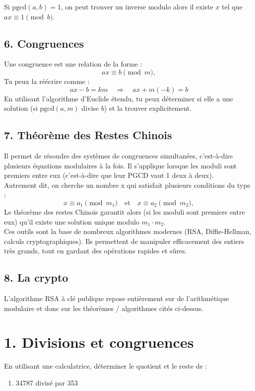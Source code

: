 Si $\text{pgcd}(a,b)=1$, on peut trouver un inverse modulo alors il existe $x$ tel que $ax \equiv 1 \pmod{b}$.

\subsection*{6. Congruences}
Une congruence est une relation de la forme :
\[
ax \equiv b \pmod{m},
\]
Tu peux la réécrire comme : 
\[
ax - b = km \quad \Rightarrow \quad ax + m(-k) = b
\]
En utilisant l’algorithme d’Euclide étendu, tu peux déterminer si elle a une solution (si $\text{pgcd}(a,m)$ divise $b$) et la trouver explicitement.\\

\subsection*{7. Théorème des Restes Chinois}
Il permet de résoudre des systèmes de congruences simultanées, c’est-à-dire plusieurs équations modulaires à la fois. Il s’applique lorsque les moduli sont premiers entre eux (c’est-à-dire que leur PGCD vaut 1 deux à deux). \\

Autrement dit, on cherche un nombre x qui satisfait plusieurs conditions du type :
\[
x \equiv a_1 \pmod{m_1} \quad \text{et} \quad x \equiv a_2 \pmod{m_2},
\]
Le théorème des restes Chinois garantit alors (si les moduli sont premiers entre eux) qu’il existe une solution unique modulo \( m_1 \cdot m_2 \). \\

Ces outils sont la base de nombreux algorithmes modernes (RSA, Diffie-Hellman, calculs cryptographiques). Ils permettent de manipuler efficacement des entiers très grands, tout en gardant des opérations rapides et sûres.

\subsection*{8. La crypto}
L'algorithme RSA à clé publique repose entièrement sur de l'arithmétique modulaire et donc sur les théorèmes / algorithmes cités ci-dessus. 

\newpage

\section*{1. Divisions et congruences}
\begin{exercise} %
    En utilisant une calculatrice, déterminer le quotient et le reste de :
    \begin{enumerate}[label=(\alph*)]
        \item 34787 divisé par 353
    \end{enumerate}
\end{exercise}

